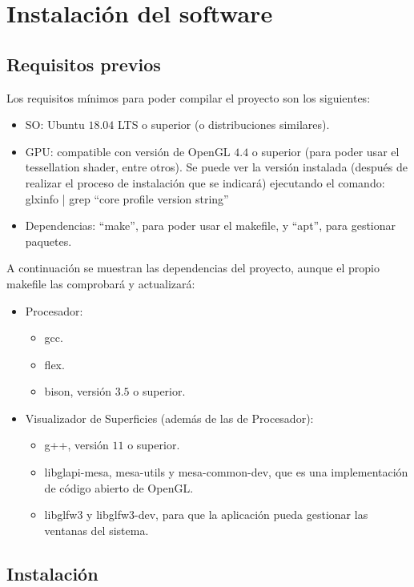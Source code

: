
\chapter{Instalación del software}\label{ap:apendice1}

\section{Requisitos previos}

Los requisitos mínimos para poder compilar el proyecto son los siguientes:
\begin{itemize}
	\item SO: Ubuntu $18.04$ LTS o superior (o distribuciones similares).
	\item GPU: compatible con versión de OpenGL $4.4$ o superior (para poder usar el tessellation shader, entre otros). Se puede ver la versión instalada (después de realizar el proceso de instalación que se indicará) ejecutando el comando: glxinfo | grep ``core profile version string''
	\item Dependencias: ``make'', para poder usar el makefile, y ``apt'', para gestionar paquetes.
\end{itemize}

A continuación se muestran las dependencias del proyecto, aunque el propio makefile las comprobará y actualizará:
\begin{itemize}
	\item Procesador:
	\begin{itemize}
		\item gcc.
		\item flex.
		\item bison, versión $3.5$ o superior.
	\end{itemize}
	\item Visualizador de Superficies (además de las de Procesador):
	\begin{itemize}
		\item g++, versión $11$ o superior.
		\item libglapi-mesa, mesa-utils y mesa-common-dev, que es una implementación de código abierto de OpenGL.
		\item libglfw$3$ y libglfw$3$-dev, para que la aplicación pueda gestionar las ventanas del sistema.
	\end{itemize}
\end{itemize}

\section{Instalación}

